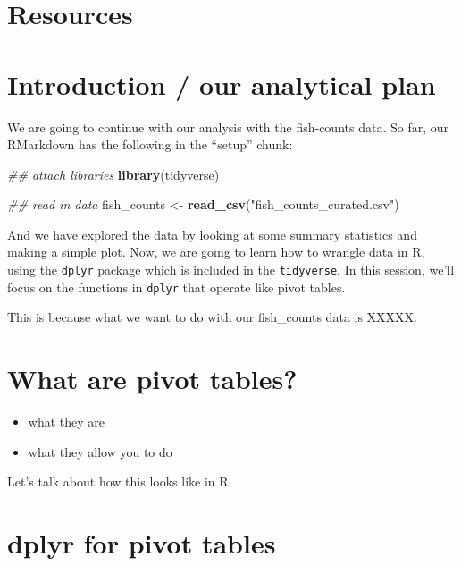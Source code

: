 \documentclass[]{book}
\newenvironment{Shaded}{\begin{snugshade}}{\end{snugshade}}
\newcommand{\CommentTok}[1]{\textcolor[rgb]{0.56,0.35,0.01}{\textit{#1}}}
\newcommand{\KeywordTok}[1]{\textcolor[rgb]{0.13,0.29,0.53}{\textbf{#1}}}
\newcommand{\NormalTok}[1]{#1}
\newcommand{\StringTok}[1]{\textcolor[rgb]{0.31,0.60,0.02}{#1}}
\providecommand{\tightlist}{%
  \setlength{\itemsep}{0pt}\setlength{\parskip}{0pt}}
\begin{document}
\hypertarget{resources-3}{%
\section{Resources}\label{resources-3}}

\hypertarget{introduction-our-analytical-plan}{%
\section{Introduction / our analytical plan}\label{introduction-our-analytical-plan}}

We are going to continue with our analysis with the fish-counts data. So far, our RMarkdown has the following in the ``setup'' chunk:

\begin{Shaded}
\begin{Highlighting}[]
\CommentTok{## attach libraries}
\KeywordTok{library}\NormalTok{(tidyverse)}

\CommentTok{## read in data}
\NormalTok{fish_counts <-}\StringTok{ }\KeywordTok{read_csv}\NormalTok{(}\StringTok{"fish_counts_curated.csv"}\NormalTok{)}
\end{Highlighting}
\end{Shaded}

And we have explored the data by looking at some summary statistics and making a simple plot. Now, we are going to learn how to wrangle data in R, using the \texttt{dplyr} package which is included in the \texttt{tidyverse}. In this session, we'll focus on the functions in \texttt{dplyr} that operate like pivot tables.

This is because what we want to do with our fish\_counts data is XXXXX.

\hypertarget{what-are-pivot-tables}{%
\section{What are pivot tables?}\label{what-are-pivot-tables}}

\begin{itemize}
\tightlist
\item
  what they are
\item
  what they allow you to do
\end{itemize}

Let's talk about how this looks like in R.

\hypertarget{dplyr-for-pivot-tables}{%
\section{dplyr for pivot tables}\label{dplyr-for-pivot-tables}}
\end{document}
